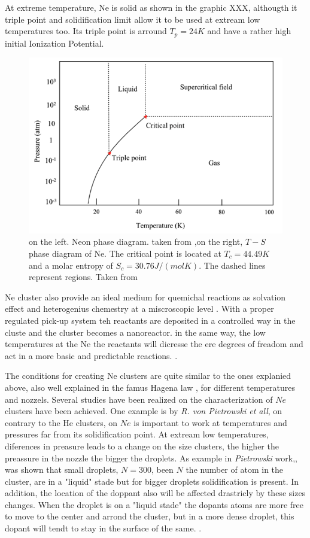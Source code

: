At extreme temperature, Ne is solid as shown in the graphic XXX, althougth it triple point and solidification limit allow it to be used at extream low temperatures too. Its triple point is arround $T_{p}=24K$ \cite{young_phase_nodate} and have a rather high initial Ionization Potential. 

\begin{figure}[hbtp]
\centering
\includegraphics[width= 8 cm]{../Images/Ne_temp_phases.png}
\caption{on the left. Neon phase diagram. taken from \cite{young_phase_nodate},on the right, $T-S$ phase diagram of Ne. The critical point is located at $T_{c}= 44.49 K$ and a molar entropy of $S_{c}=30.76 J/(mol
K)$. The dashed lines represent regions. Taken from \cite{christen_supersonic_2010-1} }
\end{figure}

Ne cluster also provide an ideal medium for quemichal reactions as solvation effect and heterogenius chemestry at a miscroscopic level \cite{gough_infrared_1985}. With a proper regulated pick-up system teh reactants are deposited in a controlled way in the cluste and the cluster becomes a nanoreactor. in the same way, the low temperatures at the Ne the reactants will dicresse the ere degrees of freadom and act in a more basic and predictable reactions. \cite{gaveau_reaction_2001}.

 The conditions for creating Ne clusters are quite similar to the ones explanied above, also well explained in the famus Hagena law \cite{hagena_cluster_1972-1}, for different temperatures and nozzels. Several studies have been realized on the characterization of $Ne$ clusters have been achieved. One example is  by \textit{R. von Pietrowski et all}, on contrary to the He clusters, on $Ne$ is important to work at temperatures and pressures far from its solidification point. At extream low temperatures, diferences in preasure leads to a change on the size clusters, the higher the preassure in the nozzle the bigger the droplets. As example in \textit{Pietrowski} work,, was shown that small droplets, $N=300$, been $N$ the number of atom in the cluster, are in a "liquid" stade but for bigger droplets solidification is present. In addition, the location of the doppant also will be affected drastricly by these sizes changes. When the droplet is on a "liquid stade" the dopants atoms are more free to move to the center and arrond the cluster, but in a more dense droplet, this dopant will tendt to stay in the surface of the same. \cite{von_pietrowski_fluorescence_1997}.

